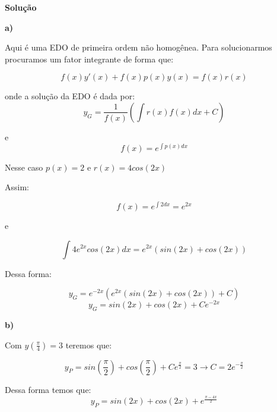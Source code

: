 \linespread{1.5}

\textbf{Solução}

\textbf{a)}

Aqui é uma EDO de primeira ordem não homogênea. Para solucionarmos procuramos um fator integrante de forma que:

\begin{equation*}
    f(x)y'(x) + f(x)p(x)y(x) = f(x)r(x) 
\end{equation*}

onde a solução da EDO é dada por:
\begin{equation*}
    y_G = \frac{1}{f(x)}\left(\int r(x)f(x) dx + C \right)
\end{equation*}

e \begin{equation*}
    f(x) = e^{\int p(x) dx}
\end{equation*}

Nesse caso $p(x) = 2$ e $r(x) = 4cos(2x)$

Assim:

\begin{equation*}
    f(x) = e^{\int 2 dx} = e^{2x}
\end{equation*}

e 

\begin{equation*}
    \int 4e^{2x}cos(2x) dx = e^{2x}(sin(2x) + cos(2x))
\end{equation*}

Dessa forma:

\begin{equation*}
    y_G = e^{-2x}(e^{2x}(sin(2x) + cos(2x)) + C)
\end{equation*}
\begin{equation*}
    \boxed{y_G = sin(2x) + cos(2x) + Ce^{-2x}}
\end{equation*}

\textbf{b)} 

Com $y\left(\frac{\pi}{4}\right) = 3$ teremos que:

\begin{equation*}
    y_P = sin\left(\frac{\pi}{2}\right) + cos\left(\frac{\pi}{2}\right) + Ce^{\frac{\pi}{2}} = 3 \longrightarrow C = 2e^{-\frac{\pi}{2}}
\end{equation*}

Dessa forma temos que:
\begin{equation*}
    \boxed{y_P = sin(2x) + cos(2x) + e^{\frac{\pi - 4x}{2}}}
\end{equation*}